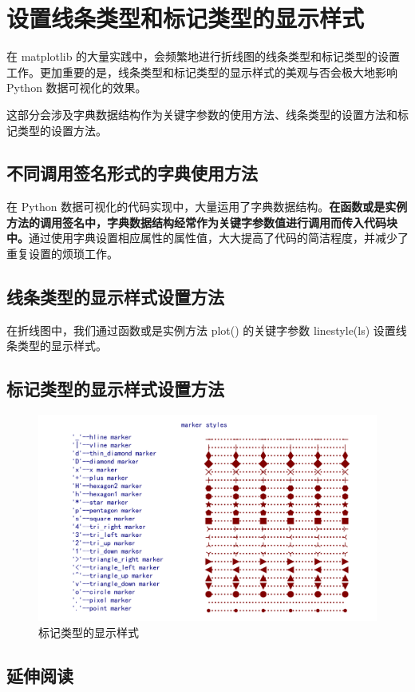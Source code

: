 \chapter{设置线条类型和标记类型的显示样式\label{ch09}}
在 matplotlib 的大量实践中，会频繁地进行折线图的线条类型和标记类型的设置工作。更加重要的是，线条类型和标记类型的显示样式的美观与否会极大地影响 Python 数据可视化的效果。

这部分会涉及字典数据结构作为关键字参数的使用方法、线条类型的设置方法和标记类型的设置方法。
\section{不同调用签名形式的字典使用方法}
在 Python 数据可视化的代码实现中，大量运用了字典数据结构。\textbf{在函数或是实例方法的调用签名中，字典数据结构经常作为关键字参数值进行调用而传入代码块中。}通过使用字典设置相应属性的属性值，大大提高了代码的简洁程度，并减少了重复设置的烦琐工作。
\section{线条类型的显示样式设置方法}
在折线图中，我们通过函数或是实例方法 plot() 的关键字参数 linestyle(ls) 设置线条类型的显示样式。
\section{标记类型的显示样式设置方法\label{193}}
\begin{figure}
    \centering
    \caption{标记类型的显示样式}
    \includegraphics{9787121348884/img/fig9-4.png}
\end{figure}
\section{延伸阅读}
